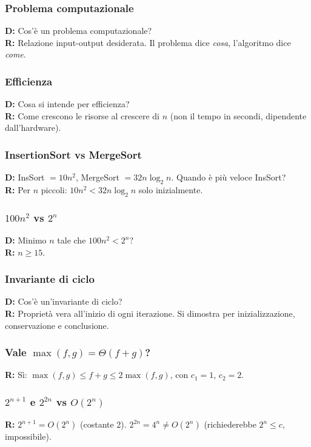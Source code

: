 \subsubsection*{Problema computazionale}
\textbf{D:} Cos'è un problema computazionale?\\
\textbf{R:} Relazione input-output desiderata. Il problema dice \textit{cosa},
l'algoritmo dice \textit{come}.

\subsubsection*{Efficienza}
\textbf{D:} Cosa si intende per efficienza?\\
\textbf{R:} Come crescono le risorse al crescere di $n$
(non il tempo in secondi, dipendente dall'hardware).

\subsubsection*{InsertionSort vs MergeSort}
\textbf{D:} InsSort $= 10n^2$, MergeSort $= 32n\log_2 n$. Quando è più
veloce InsSort?\\
\textbf{R:} Per $n$ piccoli: $10n^2 < 32n\log_2 n$ solo inizialmente.

\subsubsection*{\texorpdfstring{$100n^2$ vs $2^n$}{100n2 vs 2n}}
\textbf{D:} Minimo $n$ tale che $100n^2 < 2^n$?\\
\textbf{R:} $n \ge 15$.

\subsubsection*{Invariante di ciclo}
\textbf{D:} Cos'è un'invariante di ciclo?\\
\textbf{R:} Proprietà vera all'inizio di ogni iterazione. Si dimostra per
inizializzazione, conservazione e conclusione.

\subsubsection*{\texorpdfstring{Vale $\max(f,g) = \Theta(f+g)$?}%
	{Vale max(f,g) = Theta(f+g)?}}
\textbf{R:} Sì: $\max(f,g) \le f+g \le 2\max(f,g)$, con $c_1=1$, $c_2=2$.

\subsubsection*{\texorpdfstring{$2^{n+1}$ e $2^{2n}$ vs $O(2^n)$}%
	{2n+1 e 22n vs O(2n)}}
\textbf{R:} $2^{n+1} = O(2^n)$ (costante 2). $2^{2n} = 4^n \neq O(2^n)$
(richiederebbe $2^n \le c$, impossibile).

